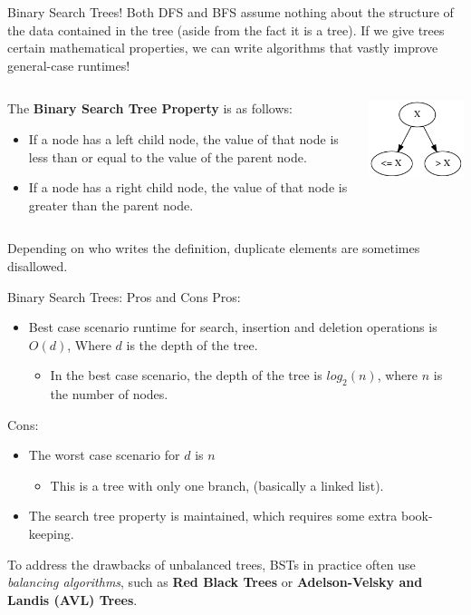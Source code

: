 \documentclass[11pt]{beamer}
\begin{document}
\begin{frame}{Binary Search Trees!}
Both DFS and BFS assume nothing about the structure of the data contained in the tree (aside from the fact it is a tree).
If we give trees certain mathematical properties, we can write algorithms that vastly improve general-case runtimes! 
\vspace{1em}
\begin{columns}
\begin{column}{0.75\textwidth}
The \textbf{Binary Search Tree Property} is as follows:
\begin{itemize}
\item If a node has a left child node, the value of that node is less than or equal to the value of the parent node.
\item If a node has a right child node, the value of that node is greater than the parent node.  
\end{itemize}
\end{column}
\begin{column}{0.25\textwidth}
\center
\includegraphics[scale=0.3]{BST_simple.png}
\end{column}
\end{columns}
\vspace{0.5em}
Depending on who writes the definition, duplicate elements are sometimes disallowed.
\end{frame}

\begin{frame}{Binary Search Trees: Pros and Cons}
Pros:
\begin{itemize}
\item Best case scenario runtime for search, insertion and deletion operations is $O(d)$, Where $d$ is the depth of the tree.
\begin{itemize}
\item In the best case scenario, the depth of the tree is $log_2(n)$, where $n$ is the number of nodes.  
\end{itemize}
\end{itemize}
Cons:
\begin{itemize}
\item The worst case scenario for $d$ is $n$
\begin{itemize}
\item This is a tree with only one branch, (basically a linked list).  
\end{itemize}
\item The search tree property is maintained, which requires some extra book-keeping.  
\end{itemize}
To address the drawbacks of unbalanced trees, BSTs in practice often use \emph{balancing algorithms}, such as \textbf{Red Black Trees} or \textbf{Adelson-Velsky and Landis (AVL) Trees}.
\end{frame}
\end{document}
